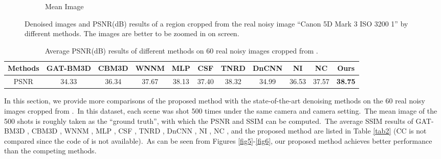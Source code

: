 \begin{figure}
\begin{subfigure}[t]{0.19\textwidth}
\caption{Mean Image}
    \end{subfigure}
    \caption{Denoised images and PSNR(dB) results of a region cropped from the real noisy image ``Canon 5D Mark 3 ISO 3200 1'' \cite{crosschannel2016} by different methods. The images are better to be zoomed in on screen.}
    \label{fig9}
\end{figure}




\begin{table}\vspace{-4mm}
\begin{adjustwidth}{-2cm}{}
\scriptsize
\caption{Average PSNR(dB) results of different methods on 60 real noisy images cropped from \cite{crosschannel2016}.}
\vspace{-4mm}
\label{tab3}
\begin{center}
\renewcommand\arraystretch{1}
\begin{tabular}{|c||c|c|c|c|c|c|c|c|c|c|}
\hline
Methods
&\textbf{GAT-BM3D}
&\textbf{CBM3D}
&\textbf{WNNM}
&\textbf{MLP}
&\textbf{CSF} 
&\textbf{TNRD} 
&\textbf{DnCNN}
&\textbf{NI} 
&\textbf{NC} 
&\textbf{Ours} 
\\
\hline
PSNR  
& 34.33 & 36.34 & 37.67 & 38.13 & 37.40 & 38.32 & 34.99 & 36.53 & 37.57 & \textbf{38.75}
\\
\hline
\end{tabular}
\end{center}
\end{adjustwidth}
\end{table}

In this section, we provide more comparisons of the proposed method with the state-of-the-art denoising methods on the 60 real noisy images cropped from \cite{crosschannel2016}.\ In this dataset, each scene was shot 500 times under the same camera and camera setting.\ The mean image of the 500 shots is roughly taken as the ``ground truth'', with which the PSNR and SSIM can be computed.\ The average SSIM results of GAT-BM3D \cite{Makitalo2013Optimal}, CBM3D \cite{bm3d}, WNNM \cite{wnnm}, MLP \cite{mlp}, CSF \cite{csf}, TNRD \cite{chen2015learning}, DnCNN \cite{zhang2017beyond}, NI \cite{neatimage}, NC \cite{noiseclinic,ncwebsite}, and the proposed method are listed in Table \ref{tab2} (CC is not compared since the code of \cite{crosschannel2016} is not available).\ As can be seen from Figures \ref{fig5}-\ref{fig6}, our proposed method achieves better performance than the competing methods.

